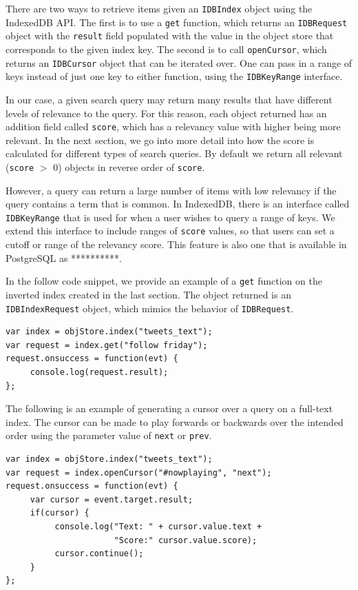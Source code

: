 \documentclass{vldb}
\begin{document}
There are two ways to retrieve items given an \texttt{IDBIndex} object using the IndexedDB API. 
The first is to use a \texttt{get} function, which returns an \texttt{IDBRequest} object with the \texttt{result} field populated with the value in the object store that corresponds to the given index key. The second is to call \texttt{openCursor}, which returns an \texttt{IDBCursor} object that can be iterated over. One can pass in a range of keys instead of just one key to either function, using the \texttt{IDBKeyRange} interface.

In our case, a given search query may return many results that have different levels of relevance to the query. For this reason, each object returned has an addition field called \texttt{score}, which has a relevancy value with higher being more relevant. 
In the next section, we go into more detail into how the score is calculated for different types of search queries.
By default we return all relevant (\texttt{score} $>$ 0) objects in reverse order of \texttt{score}. 

However, a query can return a large number of items with low relevancy if the query contains a term that is common. In IndexedDB, there is an interface called \texttt{IDBKeyRange} that is used for when a user wishes to query a range of keys. We extend this interface to include ranges of \texttt{score} values, so that users can set a cutoff or range of the relevancy score. This feature is also one that is available in PostgreSQL as **********.

In the follow code snippet, we provide an example of a \texttt{get} function on the inverted index created in the last section. The object returned is an \texttt{IDBIndexRequest} object, which mimics the behavior of \texttt{IDBRequest}.

\begin{verbatim}
var index = objStore.index("tweets_text");
var request = index.get("follow friday");
request.onsuccess = function(evt) {
     console.log(request.result);
};
\end{verbatim}

The following is an example of generating a cursor over a query on a full-text index. The cursor can be made to play forwards or backwards over the intended order using the parameter value of \texttt{next} or \texttt{prev}.

\begin{verbatim}
var index = objStore.index("tweets_text");
var request = index.openCursor("#nowplaying", "next");
request.onsuccess = function(evt) {
     var cursor = event.target.result;
     if(cursor) {
          console.log("Text: " + cursor.value.text +
                      "Score:" cursor.value.score);
          cursor.continue();
     }
};
\end{verbatim}
\end{document}
